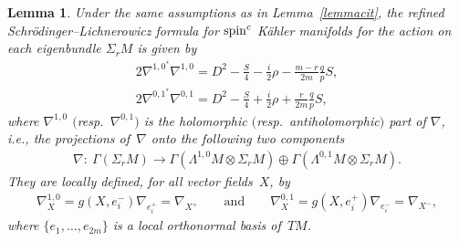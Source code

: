 \documentclass[10pt,a4paper]{amsart}
\numberwithin{equation}{section}
\newtheorem{lem}[thm]{Lemma}
\theoremstyle{definition}
\begin{document}
\begin{lem}\label{refinedd} Under  the same assumptions as in Lemma~{\rm \ref{lemmacit}}, the  refined  Schr\"odinger--Lichne\-ro\-wicz formula for ${\mathop{\rm spin}^c}$ K\"ahler manifolds  for the action on each eigenbundle $\Sigma_{r}M$ is given by
\begin{gather}\label{sl1}
 2\nabla^{{1,0}^*}\nabla^{1,0}=D^2-\frac{S}{4}-\frac{i}{2}\rho-\frac{m-r}{2m}\frac{q}{p}S,
\\
\label{sl2}
 2\nabla^{{0,1}^*}\nabla^{0,1}=D^2-\frac{S}{4}+\frac{i}{2}\rho+\frac{r}{2m}\frac{q}{p}S,
\end{gather}
where $\nabla^{1, 0}$  $($resp.\ $\nabla^{0,1})$  is the holomorphic $($resp.\ antiholomorphic$)$  part of $\nabla$, i.e., the projections of~$\nabla$ onto the following two components
\begin{gather*}
\nabla\colon \ \Gamma(\Sigma_{r}M)\to \Gamma(\Lambda^{1,0}M\otimes\Sigma_{r}M)\oplus \Gamma(\Lambda^{0,1}M\otimes\Sigma_{r}M).
\end{gather*} They are locally defined, for all vector fields~$X$,  by
\begin{gather*}
\nabla^{1, 0}_X  = g(X, e_i^-) \nabla_{e_i^+}=\nabla_{X^+} \qquad \text{and}\qquad \nabla^{0, 1}_X = g(X, e_i^+) \nabla_{e_i^-}=\nabla_{X^-},
\end{gather*}
where $\{e_1,\dots, e_{2m}\}$ is a local orthonormal basis of~$TM$.
\end{lem}
\end{document}
